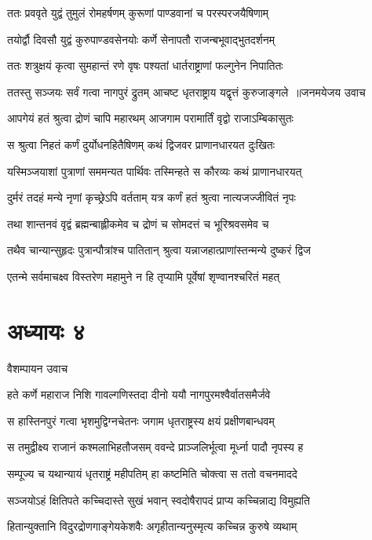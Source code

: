 \twolineshloka
{ततः प्रववृते युद्वं तुमुलं रोमहर्षणम्}
{कुरूणां पाण्डवानां च परस्परजयैषिणाम्}


\twolineshloka
{तयोर्द्वौ दिवसौ युद्वं कुरुपाण्डवसेनयोः}
{कर्णे सेनापतौ राजन्बभूवाद्भुतदर्शनम्}


\twolineshloka
{ततः शत्रुक्षयं कृत्वा सुमहान्तं रणे वृषः}
{पश्यतां धार्तराष्ट्राणां फल्गुनेन निपातितः}


\threelineshloka
{ततस्तु सञ्जयः सर्वं गत्वा नागपुरं द्रुतम्}
{आचष्ट धृतराष्ट्राय यद्वृत्तं कुरुजाङ्गले ॥जनमयेजय उवाच}
{}


\twolineshloka
{आपगेयं हतं श्रुत्वा द्रोणं चापि महारथम्}
{आजगाम परामार्तिं वृद्वो राजाऽम्बिकासुतः}


\twolineshloka
{स श्रुत्वा निहतं कर्णं दुर्योधनहितैषिणम्}
{कथं द्विजवर प्राणानधारयत दुःखितः}


\twolineshloka
{यस्मिञ्जयाशां पुत्राणां सममन्यत पार्थिवः}
{तस्मिन्हते स कौरव्यः कथं प्राणानधारयत्}


\twolineshloka
{दुर्मरं तदहं मन्ये नृणां कृच्छ्रेऽपि वर्तताम्}
{यत्र कर्णं हतं श्रुत्वा नात्यजज्जीवितं नृपः}


\twolineshloka
{तथा शान्तनवं वृद्वं ब्रह्मन्बाह्लीकमेव च}
{द्रोणं च सोमदत्तं च भूरिश्रवसमेव च}


\twolineshloka
{तथैव चान्यान्सुहृदः पुत्रान्पौत्रांश्च पातितान्}
{श्रुत्वा यन्नाजहात्प्राणांस्तन्मन्ये दुष्करं द्विज}


\twolineshloka
{एतन्मे सर्वमाचक्ष्व विस्तरेण महामुने}
{न हि तृप्यामि पूर्वेषां शृण्वानश्चरितं महत्}


\chapter{अध्यायः ४}
\twolineshloka
{वैशम्पायन उवाच}
{}


\twolineshloka
{हते कर्णे महाराज निशि गावल्गणिस्तदा}
{दीनो ययौ नागपुरमश्वैर्वातसमैर्जवे}


\twolineshloka
{स हास्तिनपुरं गत्वा भृशमुद्विग्नचेतनः}
{जगाम धृतराष्ट्रस्य क्षयं प्रक्षीणबान्धवम्}


\twolineshloka
{स तमुद्वीक्ष्य राजानं कश्मलाभिहतौजसम्}
{ववन्दे प्राञ्जलिर्भूत्वा मूर्ध्ना पादौ नृपस्य ह}


\twolineshloka
{सम्पूज्य च यथान्यायं धृतराष्ट्रं महीपतिम्}
{हा कष्टमिति चोक्त्वा स ततो वचनमाददे}


\twolineshloka
{सञ्जयोऽहं क्षितिपते कच्चिदास्ते सुखं भवान्}
{स्वदोषैरापदं प्राप्य कच्चिन्नाद्य विमुह्यति}


\twolineshloka
{हितान्युक्तानि विदुरद्रोणगाङ्गेयकेशवैः}
{अगृहीतान्यनुस्मृत्य कच्चिन्न कुरुषे व्यथाम्}


